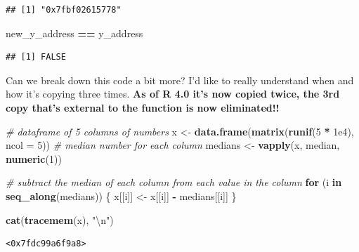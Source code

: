 \documentclass[]{book}
\newenvironment{Shaded}{\begin{snugshade}}{\end{snugshade}}
\newcommand{\CharTok}[1]{\textcolor[rgb]{0.31,0.60,0.02}{#1}}
\newcommand{\CommentTok}[1]{\textcolor[rgb]{0.56,0.35,0.01}{\textit{#1}}}
\newcommand{\ControlFlowTok}[1]{\textcolor[rgb]{0.13,0.29,0.53}{\textbf{#1}}}
\newcommand{\DataTypeTok}[1]{\textcolor[rgb]{0.13,0.29,0.53}{#1}}
\newcommand{\DecValTok}[1]{\textcolor[rgb]{0.00,0.00,0.81}{#1}}
\newcommand{\FloatTok}[1]{\textcolor[rgb]{0.00,0.00,0.81}{#1}}
\newcommand{\KeywordTok}[1]{\textcolor[rgb]{0.13,0.29,0.53}{\textbf{#1}}}
\newcommand{\NormalTok}[1]{#1}
\newcommand{\OperatorTok}[1]{\textcolor[rgb]{0.81,0.36,0.00}{\textbf{#1}}}
\newcommand{\StringTok}[1]{\textcolor[rgb]{0.31,0.60,0.02}{#1}}
\begin{document}
\begin{verbatim}
## [1] "0x7fbf02615778"
\end{verbatim}

\begin{Shaded}
\begin{Highlighting}[]
\NormalTok{new_y_address }\OperatorTok{==}\StringTok{ }\NormalTok{y_address}
\end{Highlighting}
\end{Shaded}

\begin{verbatim}
## [1] FALSE
\end{verbatim}

Can we break down this code a bit more? I'd like to really understand when and how it's copying three times. \textbf{As of R 4.0 it's now copied twice, the 3rd copy that's external to the function is now eliminated!!}

\begin{Shaded}
\begin{Highlighting}[]
\CommentTok{# dataframe of 5 columns of numbers}
\NormalTok{x <-}\StringTok{ }\KeywordTok{data.frame}\NormalTok{(}\KeywordTok{matrix}\NormalTok{(}\KeywordTok{runif}\NormalTok{(}\DecValTok{5} \OperatorTok{*}\StringTok{ }\FloatTok{1e4}\NormalTok{), }\DataTypeTok{ncol =} \DecValTok{5}\NormalTok{))}
\CommentTok{# median number for each column}
\NormalTok{medians <-}\StringTok{ }\KeywordTok{vapply}\NormalTok{(x, median, }\KeywordTok{numeric}\NormalTok{(}\DecValTok{1}\NormalTok{))}

\CommentTok{# subtract the median of each column from each value in the column}
\ControlFlowTok{for}\NormalTok{ (i }\ControlFlowTok{in} \KeywordTok{seq_along}\NormalTok{(medians)) \{}
\NormalTok{  x[[i]] <-}\StringTok{ }\NormalTok{x[[i]] }\OperatorTok{-}\StringTok{ }\NormalTok{medians[[i]]}
\NormalTok{\}}
\end{Highlighting}
\end{Shaded}

\begin{Shaded}
\begin{Highlighting}[]
\KeywordTok{cat}\NormalTok{(}\KeywordTok{tracemem}\NormalTok{(x), }\StringTok{"}\CharTok{\textbackslash{}n}\StringTok{"}\NormalTok{)}
\end{Highlighting}
\end{Shaded}

\begin{verbatim}
<0x7fdc99a6f9a8> 
\end{verbatim}
\end{document}
